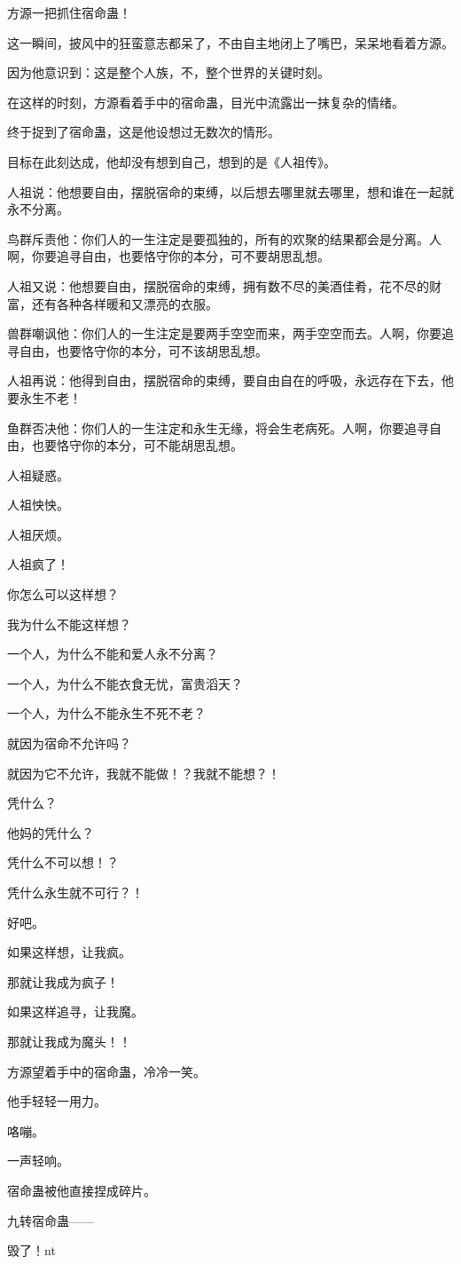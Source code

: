 \begin{this_body}
方源一把抓住宿命蛊！

这一瞬间，披风中的狂蛮意志都呆了，不由自主地闭上了嘴巴，呆呆地看着方源。

因为他意识到：这是整个人族，不，整个世界的关键时刻。

在这样的时刻，方源看着手中的宿命蛊，目光中流露出一抹复杂的情绪。

终于捉到了宿命蛊，这是他设想过无数次的情形。

目标在此刻达成，他却没有想到自己，想到的是《人祖传》。

人祖说：他想要自由，摆脱宿命的束缚，以后想去哪里就去哪里，想和谁在一起就永不分离。

鸟群斥责他：你们人的一生注定是要孤独的，所有的欢聚的结果都会是分离。人啊，你要追寻自由，也要恪守你的本分，可不要胡思乱想。

人祖又说：他想要自由，摆脱宿命的束缚，拥有数不尽的美酒佳肴，花不尽的财富，还有各种各样暖和又漂亮的衣服。

兽群嘲讽他：你们人的一生注定是要两手空空而来，两手空空而去。人啊，你要追寻自由，也要恪守你的本分，可不该胡思乱想。

人祖再说：他得到自由，摆脱宿命的束缚，要自由自在的呼吸，永远存在下去，他要永生不老！

鱼群否决他：你们人的一生注定和永生无缘，将会生老病死。人啊，你要追寻自由，也要恪守你的本分，可不能胡思乱想。

人祖疑惑。

人祖怏怏。

人祖厌烦。

人祖疯了！

你怎么可以这样想？

我为什么不能这样想？

一个人，为什么不能和爱人永不分离？

一个人，为什么不能衣食无忧，富贵滔天？

一个人，为什么不能永生不死不老？

就因为宿命不允许吗？

就因为它不允许，我就不能做！？我就不能想？！

凭什么？

他妈的凭什么？

凭什么不可以想！？

凭什么永生就不可行？！

好吧。

如果这样想，让我疯。

那就让我成为疯子！

如果这样追寻，让我魔。

那就让我成为魔头！！

方源望着手中的宿命蛊，冷冷一笑。

他手轻轻一用力。

咯嘣。

一声轻响。

宿命蛊被他直接捏成碎片。

九转宿命蛊——

毁了！nt

\end{this_body}

